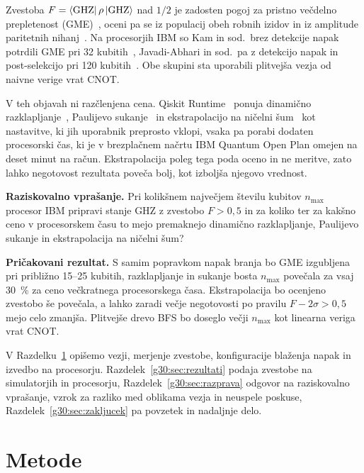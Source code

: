 Zvestoba $F = \bra{\mathrm{GHZ}}\rho\ket{\mathrm{GHZ}}$ nad $1/2$ je zadosten pogoj za pristno večdelno prepletenost (GME)~\cite{g30:guhne2009}, oceni pa se iz populacij obeh robnih izidov in iz amplitude paritetnih nihanj~\cite{g30:monz2011}. Na procesorjih IBM so Kam in sod.\ brez detekcije napak potrdili GME pri 32 kubitih~\cite{g30:kam2024}, Javadi-Abhari in sod.\ pa z detekcijo napak in post-selekcijo pri 120 kubitih~\cite{g30:bigcats2025}. Obe skupini sta uporabili plitvejša vezja od naivne verige vrat CNOT.

V teh objavah ni razčlenjena cena. Qiskit Runtime~\cite{qiskit2024} ponuja dinamično razklapljanje~\cite{g30:ezzell2023}, Paulijevo sukanje~\cite{g30:wallman2016} in ekstrapolacijo na ničelni šum~\cite{temme2017} kot nastavitve, ki jih uporabnik preprosto vklopi, vsaka pa porabi dodaten procesorski čas, ki je v brezplačnem načrtu IBM Quantum Open Plan omejen na deset minut na račun. Ekstrapolacija poleg tega poda oceno in ne meritve, zato lahko negotovost rezultata poveča bolj, kot izboljša njegovo vrednost.

\begin{svgraybox}
\textbf{Raziskovalno vprašanje.} Pri kolikšnem največjem številu kubitov $n_{\mathrm{max}}$ procesor IBM pripravi stanje GHZ z zvestobo $F > 0{,}5$ in za koliko ter za kakšno ceno v procesorskem času to mejo premaknejo dinamično razklapljanje, Paulijevo sukanje in ekstrapolacija na ničelni šum?

\textbf{Pričakovani rezultat.} S samim popravkom napak branja bo GME izgubljena pri približno 15--25 kubitih, razklapljanje in sukanje bosta $n_{\mathrm{max}}$ povečala za vsaj 30~\% za ceno večkratnega procesorskega časa. Ekstrapolacija bo ocenjeno zvestobo še povečala, a lahko zaradi večje negotovosti po pravilu $F - 2\sigma > 0{,}5$ mejo celo zmanjša. Plitvejše drevo BFS bo doseglo večji $n_{\mathrm{max}}$ kot linearna veriga vrat CNOT.
\end{svgraybox}

V Razdelku~\ref{g30:sec:metode} opišemo vezji, merjenje zvestobe, konfiguracije blaženja napak in izvedbo na procesorju. Razdelek~\ref{g30:sec:rezultati} podaja zvestobe na simulatorjih in procesorju, Razdelek~\ref{g30:sec:razprava} odgovor na raziskovalno vprašanje, vzrok za razliko med oblikama vezja in neuspele poskuse, Razdelek~\ref{g30:sec:zakljucek} pa povzetek in nadaljnje delo.


\section{Metode}
\label{g30:sec:metode}

